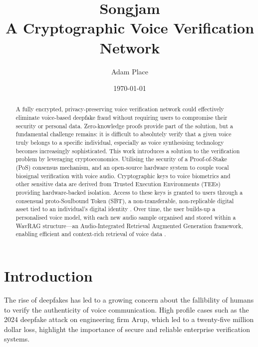 \documentclass[11pt,a4paper]{article}
\title{Songjam\\[0.5em]\large A Cryptographic Voice Verification Network}
\author{Adam Place}
\date{\today}
\begin{document}
\maketitle
\thispagestyle{fancy} %
\pagestyle{fancy}
\fancyhf{} %
\fancyfoot[L]{\thepage} %
\renewcommand{\headrulewidth}{0pt} %
\renewcommand{\footrulewidth}{0.4pt} %

\begin{abstract}
A fully encrypted, privacy-preserving voice verification network could effectively eliminate voice-based deepfake fraud without requiring users to compromise their security or personal data.
Zero-knowledge proofs provide part of the solution, but a fundamental challenge remains: it is difficult to absolutely verify that a given voice truly belongs to a specific individual, especially as voice synthesising technology becomes increasingly sophisticated.
This work introduces a solution to the verification problem by leveraging cryptoeconomics.
Utilising the security of a Proof-of-Stake (PoS) consensus mechanism, and an open-source hardware system to couple vocal biosignal verification with voice audio.
Cryptographic keys to voice biometrics and other sensitive data are derived from Trusted Execution Environments (TEEs) providing hardware-backed isolation.
Access to these keys is granted to users through a consensual proto-Soulbound Token (SBT), a non-transferable, non-replicable digital asset tied to an individual's digital identity \cite{buterin2022soulbound}.
Over time, the user builds-up a personalised voice model, with each new audio sample organised and stored within a WavRAG structure---an Audio-Integrated Retrieval Augmented Generation framework, enabling efficient and context-rich retrieval of voice data \cite{chen2025wavrag}.
\end{abstract}

\section{Introduction}
\label{sec:introduction}
The rise of deepfakes has led to a growing concern about the fallibility of humans to verify the authenticity of voice communication.
High profile cases such as the 2024 deepfake attack on engineering firm Arup, which led to a twenty-five million dollar loss, highlight the importance of secure and reliable enterprise verification systems.
\end{document}
